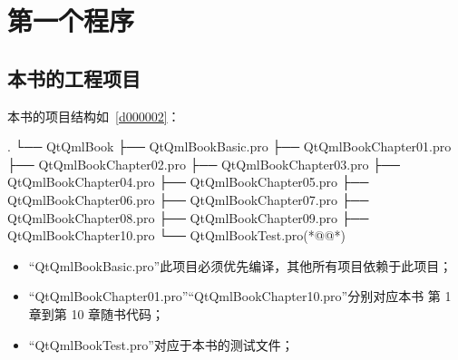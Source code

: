 ﻿




%

\FloatBarrier
\section{
第一个程序
}\label{s100210}


\FloatBarrier
\subsection{
本书的工程项目
}\label{ss001u10}


本书的项目结构如\treeindexnumbernameone\ \ref{d000002}：
{}\label{d000002}    %
\begin{thebookfilesourceonepathtree}[escapeinside={(*@}{@*)},
caption=GoodLuck,
numbers=none,
title=\treeindexnumbernameone \thetreeindexnumber
]
.
└── QtQmlBook
    ├── QtQmlBookBasic.pro
    ├── QtQmlBookChapter01.pro
    ├── QtQmlBookChapter02.pro
    ├── QtQmlBookChapter03.pro
    ├── QtQmlBookChapter04.pro
    ├── QtQmlBookChapter05.pro
    ├── QtQmlBookChapter06.pro
    ├── QtQmlBookChapter07.pro
    ├── QtQmlBookChapter08.pro
    ├── QtQmlBookChapter09.pro
    ├── QtQmlBookChapter10.pro
    └── QtQmlBookTest.pro(*@\marginpar[\hfill\setlength\fboxsep{2pt}\fbox{\footnotesize{\kaishu\parbox{1em}{\setlength{\baselineskip}{2pt}\treeindexnumbernameone}}\footnotesize{\thetreeindexnumber}}]{\setlength\fboxsep{2pt}\fbox{\footnotesize{\kaishu\parbox{1em}{\setlength{\baselineskip}{2pt}\treeindexnumbernameone}}\footnotesize{\thetreeindexnumber}}}@*)\end{thebookfilesourceonepathtree}          %
\addtocounter{lstlisting}{-1}   %


\begin{itemize}

\item “QtQmlBookBasic.pro”此项目必须优先编译，其他所有项目依赖于此项目；
\item “QtQmlBookChapter01.pro”\raisebox{0.16ex}{\sourcefonttwo\~{}}“QtQmlBookChapter10.pro”分别对应本书
第 1 章到第 10 章随书代码；
\item “QtQmlBookTest.pro”对应于本书的测试文件；

\end{itemize}

